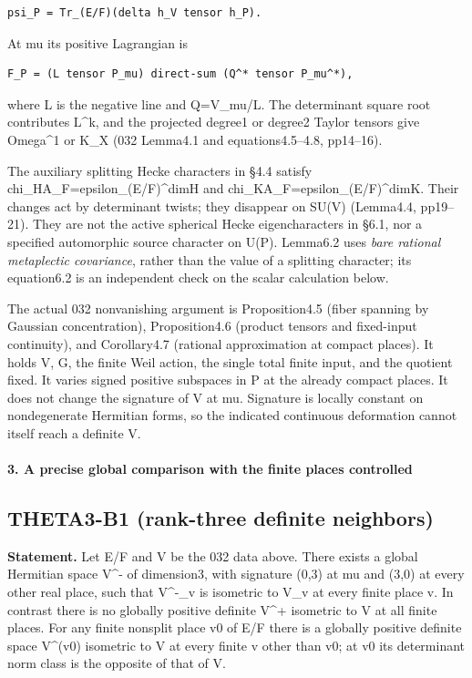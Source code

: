 \begin{verbatim}
psi_P = Tr_(E/F)(delta h_V tensor h_P).
\end{verbatim}

At mu its positive Lagrangian is

\begin{verbatim}
F_P = (L tensor P_mu) direct-sum (Q^* tensor P_mu^*),
\end{verbatim}

where L is the negative line and Q=V\_mu/L. The determinant square root contributes L\^{}k, and the projected degree1 or degree2 Taylor tensors give Omega\^{}1 or K\_X (032 Lemma4.1 and equations4.5--4.8, pp14--16).

The auxiliary splitting Hecke characters in §4.4 satisfy chi\_H\textbar A\_F=epsilon\_(E/F)\^{}dimH and chi\_K\textbar A\_F=epsilon\_(E/F)\^{}dimK. Their changes act by determinant twists; they disappear on SU(V) (Lemma4.4, pp19--21). They are not the active spherical Hecke eigencharacters in §6.1, nor a specified automorphic source character on U(P). Lemma6.2 uses \emph{bare rational metaplectic covariance}, rather than the value of a splitting character; its equation6.2 is an independent check on the scalar calculation below.

The actual 032 nonvanishing argument is Proposition4.5 (fiber spanning by Gaussian concentration), Proposition4.6 (product tensors and fixed-input continuity), and Corollary4.7 (rational approximation at compact places). It holds V, G, the finite Weil action, the single total finite input, and the quotient fixed. It varies signed positive subspaces in P at the already compact places. It does not change the signature of V at mu. Signature is locally constant on nondegenerate Hermitian forms, so the indicated continuous deformation cannot itself reach a definite V.

\paragraph{3. A precise global comparison with the finite places controlled}\label{a-precise-global-comparison-with-the-finite-places-controlled}

\subsection{THETA3-B1 (rank-three definite neighbors)}\label{theta3-b1-rank-three-definite-neighbors}\label{B1}

\textbf{Statement.} Let E/F and V be the 032 data above. There exists a global Hermitian space V\^{}- of dimension3, with signature (0,3) at mu and (3,0) at every other real place, such that V\^{}-\_v is isometric to V\_v at every finite place v. In contrast there is no globally positive definite V\^{}+ isometric to V at all finite places. For any finite nonsplit place v0 of E/F there is a globally positive definite space V\^{}(v0) isometric to V at every finite v other than v0; at v0 its determinant norm class is the opposite of that of V.

